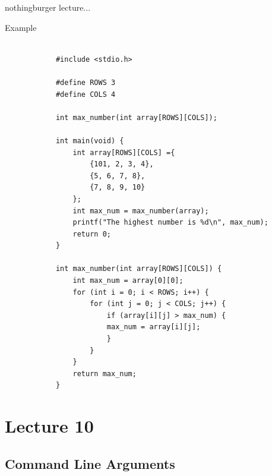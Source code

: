\documentclass{article}
\begin{document}
	nothingburger lecture...

	\begin{question}{Example}
		\begin{verbatim}

			#include <stdio.h>

			#define ROWS 3
			#define COLS 4

			int max_number(int array[ROWS][COLS]);

			int main(void) {
				int array[ROWS][COLS] ={
					{101, 2, 3, 4},
					{5, 6, 7, 8},
					{7, 8, 9, 10}
				};
				int max_num = max_number(array);
				printf("The highest number is %d\n", max_num);
				return 0;
			}

			int max_number(int array[ROWS][COLS]) {
				int max_num = array[0][0];
				for (int i = 0; i < ROWS; i++) {
					for (int j = 0; j < COLS; j++) {
						if (array[i][j] > max_num) {
						max_num = array[i][j];
						}
					}
				}
				return max_num;
			}

		\end{verbatim}
	\end{question}

\newpage

\section{Lecture 10}
	
	\subsection{Command Line Arguments}
\end{document}
